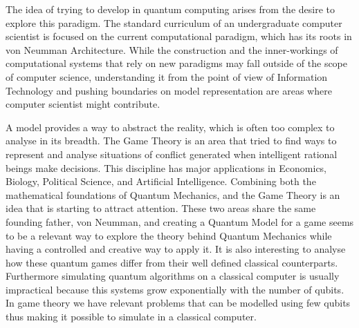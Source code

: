 The idea of trying to develop in quantum computing arises from the desire to explore this paradigm. The standard curriculum of an undergraduate computer scientist is focused on the current computational paradigm, which has its roots in von Neumman Architecture\cite{neumann45edvac}. While the construction and the inner-workings of computational systems that rely on new paradigms may fall outside of the scope of computer science, understanding it from the point of view of Information Technology and pushing boundaries on model representation are areas where computer scientist might contribute.

A model provides a way to abstract the reality, which is often too complex to analyse in its breadth. The Game Theory is an area that tried to find ways to represent and analyse situations of conflict generated when intelligent rational beings make decisions. This discipline has major applications in Economics, Biology, Political Science, and Artificial Intelligence. 
Combining both the mathematical foundations of Quantum Mechanics, and the Game Theory is an idea that is starting to attract attention. These two areas share the same founding father, von Neumman, and creating a Quantum Model for a game seems to be a relevant way to explore the theory behind Quantum Mechanics while having a controlled and creative way to apply it. It is also interesting to analyse how these quantum games differ from their well defined classical counterparts. Furthermore  simulating quantum algorithms on a classical computer is usually impractical because this systems grow exponentially with the number of qubits. In game theory we have relevant problems that can be modelled using few qubits thus making it possible to simulate in a classical computer.
